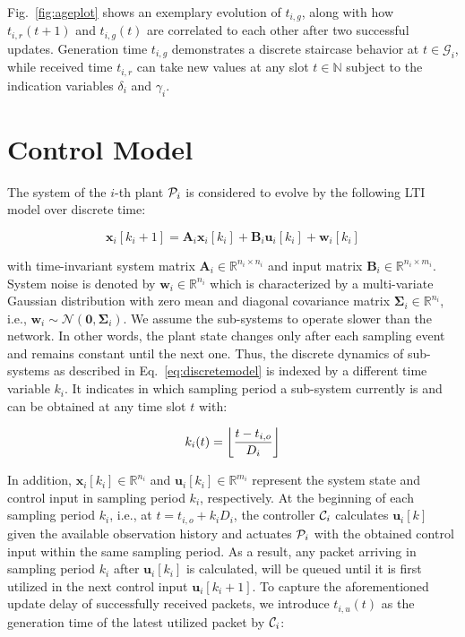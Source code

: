 Fig.~\ref{fig:ageplot} shows an exemplary evolution of $t_{i,g}$, along with how
${t_{i,r}(t+1)}$ and $t_{i,g}(t)$ are correlated to each other after two
successful updates. Generation time $t_{i,g}$ demonstrates a discrete staircase
behavior at $t \in \mathcal{G}_i$, while received time $t_{i,r}$ can take new
values at any slot $t \in \mathbb{N}$ subject to the indication variables
$\delta_i$ and $\gamma_i$.

\section{Control Model} \label{sec:control}

The system of the $i$-th plant $\mathcal{P}_i$ is considered to evolve by the following
LTI model over discrete time:

\begin{equation}
  \label{eq:discretemodel}
  \boldsymbol{x}_i[k_i+1] = \boldsymbol{A}_i \boldsymbol{x}_i[k_i] + \boldsymbol{B}_i \boldsymbol{u}_i[k_i] + \boldsymbol{w}_i[k_i]
\end{equation}

with time-invariant system matrix $\boldsymbol{A}_i \in \mathbb{R}^{n_i\times
n_i}$ and input matrix $\boldsymbol{B}_i \in \mathbb{R}^{n_i\times m_i}$. System
noise is denoted by $\boldsymbol{w}_i \in \mathbb{R}^{n_i}$ which is
characterized by a multi-variate Gaussian distribution with zero mean and
diagonal covariance matrix $\mathbf{\Sigma}_i \in \mathbb{R}^{n_i}$, i.e.,
$\boldsymbol{w}_i \sim \mathcal{N}(\mathbf{0}, \mathbf{\Sigma}_i)$. We assume
the sub-systems to operate slower than the network. In other words, the plant
state changes only after each sampling event and remains constant until the next
one. Thus, the discrete dynamics of sub-systems as described in
Eq.~\eqref{eq:discretemodel} is indexed by a different time variable $k_i$. It
indicates in which sampling period a sub-system currently is and can be obtained
at any time slot $t$ with:

\begin{equation}
  \label{eq:k_map}
	k_i(t) = \left\lfloor \frac{t - t_{i,o}}{D_i} \right\rfloor
\end{equation}

In addition, $\boldsymbol{x}_i[k_i] \in \mathbb{R}^{n_i}$ and
$\boldsymbol{u}_i[k_i] \in \mathbb{R}^{m_i}$ represent the system state and
control input in sampling period $k_i$, respectively. At the beginning of each
sampling period $k_i$, i.e., at $t=t_{i,o}+k_iD_i$, the controller $\mathcal{C}_i$
calculates $\boldsymbol{u}_i[k]$ given the available observation history and
actuates $\mathcal{P}_i$ with the obtained control input within the same sampling
period. As a result, any packet arriving in sampling period $k_i$ after
$\boldsymbol{u}_i[k_i]$ is calculated, will be queued until it is first utilized
in the next control input $\boldsymbol{u}_i[k_i+1]$. To capture the
aforementioned update delay of successfully received packets, we introduce
$t_{i,u}(t)$ as the generation time of the latest utilized packet by
$\mathcal{C}_i$:

